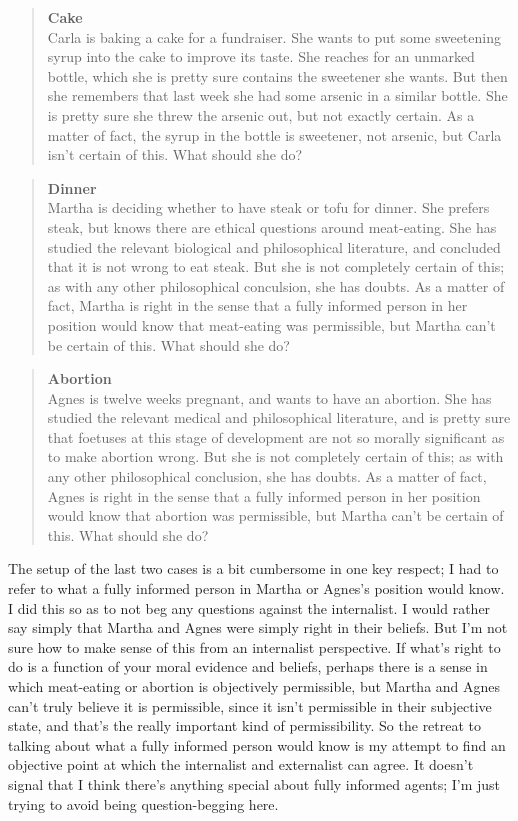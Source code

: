 \begin{quote}

\textbf{Cake}\\
Carla is baking a cake for a fundraiser. She wants to put some sweetening syrup into the cake to improve its taste. She reaches for an unmarked bottle, which she is pretty sure contains the sweetener she wants. But then she remembers that last week she had some arsenic in a similar bottle. She is pretty sure she threw the arsenic out, but not exactly certain. As a matter of fact, the syrup in the bottle is sweetener, not arsenic, but Carla isn't certain of this. What should she do?
\end{quote}
\begin{quote}

\textbf{Dinner}\\
Martha is deciding whether to have steak or tofu for dinner. She prefers steak, but knows there are ethical questions around meat-eating. She has studied the relevant biological and philosophical literature, and concluded that it is not wrong to eat steak. But she is not completely certain of this; as with any other philosophical conculsion, she has doubts. As a matter of fact, Martha is right in the sense that a fully informed person in her position would know that meat-eating was permissible, but Martha can't be certain of this. What should she do?
\end{quote}
\begin{quote}

\textbf{Abortion}\\
Agnes is twelve weeks pregnant, and wants to have an abortion. She has studied the relevant medical and philosophical literature, and is pretty sure that foetuses at this stage of development are not so morally significant as to make abortion wrong. But she is not completely certain of this; as with any other philosophical conclusion, she has doubts. As a matter of fact, Agnes is right in the sense that a fully informed person in her position would know that abortion was permissible, but Martha can't be certain of this. What should she do?
\end{quote}
The setup of the last two cases is a bit cumbersome in one key respect; I had to refer to what a fully informed person in Martha or Agnes's position would know. I did this so as to not beg any questions against the internalist. I would rather say simply that Martha and Agnes were simply right in their beliefs. But I'm not sure how to make sense of this from an internalist perspective. If what's right to do is a function of your moral evidence and beliefs, perhaps there is a sense in which meat-eating or abortion is objectively permissible, but Martha and Agnes can't truly believe it is permissible, since it isn't permissible in their subjective state, and that's the really important kind of permissibility. So the retreat to talking about what a fully informed person would know is my attempt to find an objective point at which the internalist and externalist can agree. It doesn't signal that I think there's anything special about fully informed agents; I'm just trying to avoid being question-begging here.

